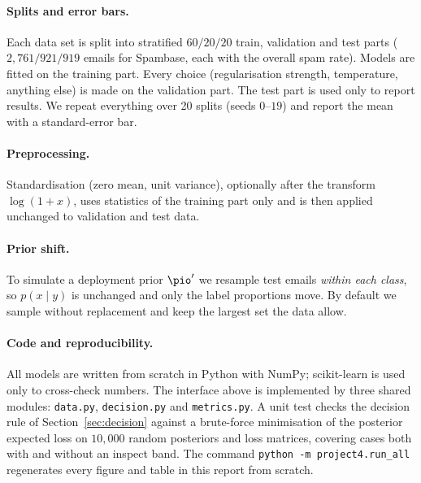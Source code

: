\paragraph{Splits and error bars.}
Each data set is split into stratified $60/20/20$ train, validation and test parts
($2{,}761/921/919$ emails for Spambase, each with the overall spam rate). Models are fitted on the
training part. Every choice (regularisation strength, temperature, anything else) is made on the
validation part. The test part is used only to report results. We repeat everything over 20 splits
(seeds $0$--$19$) and report the mean with a standard-error bar.

\paragraph{Preprocessing.}
Standardisation (zero mean, unit variance), optionally after the transform $\log(1+x)$, uses
statistics of the training part only and is then applied unchanged to validation and test data.

\paragraph{Prior shift.}
To simulate a deployment prior $\pio'$ we resample test emails \emph{within each class}, so
$p(x\mid y)$ is unchanged and only the label proportions move. By default we sample without
replacement and keep the largest set the data allow.

\paragraph{Code and reproducibility.}
All models are written from scratch in Python with NumPy; scikit-learn is used only to cross-check
numbers. The interface above is implemented by three shared modules: \texttt{data.py},
\texttt{decision.py} and \texttt{metrics.py}. A unit test checks the decision rule of
Section~\ref{sec:decision} against a brute-force
minimisation of the posterior expected loss on $10{,}000$ random posteriors and loss matrices,
covering cases both with and without an inspect band. The command
\texttt{python -m project4.run\_all} regenerates every figure and table in this report from scratch.
